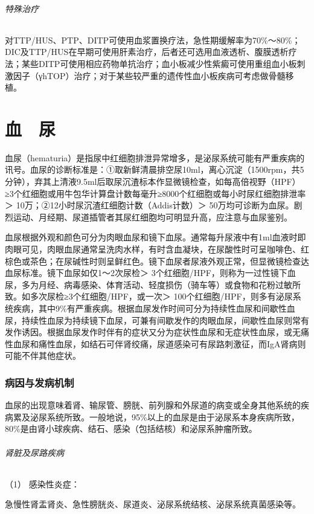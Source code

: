 \subparagraph{特殊治疗}

对TTP/HUS、PTP、DITP可使用血浆置换疗法，急性期缓解率为70\%～80\%；DIC及TTP/HUS在早期可使用肝素治疗，后者还可选用血液透析、腹膜透析疗法；某些DITP可使用相应药物单抗治疗；血小板减少性紫癜可使用重组血小板刺激因子（γhTOP）治疗；对于某些较严重的遗传性血小板疾病可考虑做骨髓移植。

\protect\hypertarget{text00037.html}{}{}

\chapter{血　尿}

血尿（hematuria）是指尿中红细胞排泄异常增多，是泌尿系统可能有严重疾病的讯号。血尿的诊断标准是：①取新鲜清晨排空尿10ml，离心沉淀（1500rpm，共5分钟），弃其上清液9.5ml后取尿沉渣标本作显微镜检查，如每高倍视野（HPF）≥3个红细胞或用牛包华计算盘计数每毫升≥8000个红细胞或每小时尿红细胞排泄率＞
10万；②12小时尿沉渣红细胞计数（Addis计数）＞
50万均可诊断为血尿。剧烈运动、月经期、尿道插管者其尿红细胞均可明显升高，应注意与血尿鉴别。

血尿根据外观和颜色可分为肉眼血尿和镜下血尿。通常每升尿液中有1ml血液时即肉眼可见，肉眼血尿通常呈洗肉水样，有时含血凝块，在尿酸性时可呈咖啡色、红棕色或茶色；在尿碱性时则呈鲜红色。镜下血尿者尿液外观正常，但显微镜检查达血尿标准。镜下血尿如仅1～2次尿检＞
3个红细胞/HPF，则称为一过性镜下血尿，多为月经、病毒感染、体育活动、轻度损伤（骑车等）或食物和花粉过敏所致。如多次尿检≥3个红细胞/HPF，或一次＞
100个红细胞/HPF，则多有泌尿系统疾病，其中9\%有严重疾病。根据血尿发作时间可分为持续性血尿和间歇性血尿，持续性血尿为持续镜下血尿，可兼有间歇发作的肉眼血尿，间歇性血尿则常有发作诱因。根据血尿发作时伴有的症状又分为症状性血尿和无症状性血尿，或无痛性血尿和痛性血尿，如结石可伴肾绞痛，尿道感染可有尿路刺激征，而IgA肾病则可能不伴其他症状。

\subsection{病因与发病机制}

血尿的出现意味着肾、输尿管、膀胱、前列腺和外尿道的病变或全身其他系统的疾病累及泌尿系统所致。一般地说，95\%以上的血尿是由于泌尿系本身疾病所致，80\%是由肾小球疾病、结石、感染（包括结核）和泌尿系肿瘤所致。

\subparagraph{肾脏及尿路疾病}

\hypertarget{text00037.htmlux5cux23CHP1-15-1-1-1}{}
（1） 感染性炎症：

急慢性肾盂肾炎、急性膀胱炎、尿道炎、泌尿系统结核、泌尿系统真菌感染等。

